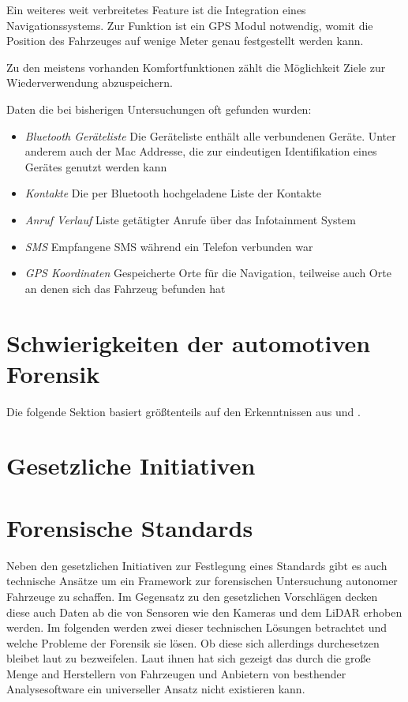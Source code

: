 \documentclass[conference,compsoc,final,a4paper]{IEEEtran}
\begin{document}
Ein weiteres weit verbreitetes Feature ist die Integration eines Navigationssystems.
Zur Funktion ist ein \ac{GPS} Modul notwendig, womit die Position des Fahrzeuges auf wenige Meter genau festgestellt werden kann.

Zu den meistens vorhanden Komfortfunktionen zählt die Möglichkeit Ziele zur Wiederverwendung abzuspeichern.

Daten die bei bisherigen Untersuchungen oft gefunden wurden:~\cite{Lacroix2017}
\begin{itemize}
  \item \emph{Bluetooth Geräteliste} Die Geräteliste enthält alle verbundenen Geräte. Unter anderem auch der Mac Addresse, die zur eindeutigen Identifikation eines Gerätes genutzt werden kann
  \item \emph{Kontakte} Die per Bluetooth hochgeladene Liste der Kontakte
  \item \emph{Anruf Verlauf} Liste getätigter Anrufe über das Infotainment System
  \item \emph{SMS} Empfangene SMS während ein Telefon verbunden war
  \item \emph{GPS Koordinaten} Gespeicherte Orte für die Navigation, teilweise auch Orte an denen sich das Fahrzeug befunden hat
\end{itemize}

\section{Schwierigkeiten der automotiven Forensik}

Die folgende Sektion basiert größtenteils auf den Erkenntnissen aus  und .



\section{Gesetzliche Initiativen}


\section{Forensische Standards}

Neben den gesetzlichen Initiativen zur Festlegung eines Standards gibt es auch technische Ansätze um ein Framework zur forensischen
Untersuchung autonomer Fahrzeuge zu schaffen. Im Gegensatz zu den gesetzlichen Vorschlägen decken diese auch Daten ab die von Sensoren
wie den Kameras und dem \ac{LiDAR} erhoben werden.
Im folgenden werden zwei dieser technischen Lösungen betrachtet und welche Probleme der Forensik sie lösen.
Ob diese sich allerdings durchesetzen bleibet laut  zu bezweifelen. Laut ihnen
hat sich gezeigt das durch die große Menge and Herstellern von Fahrzeugen und Anbietern von besthender Analysesoftware
ein universeller Ansatz nicht existieren kann.
\end{document}
